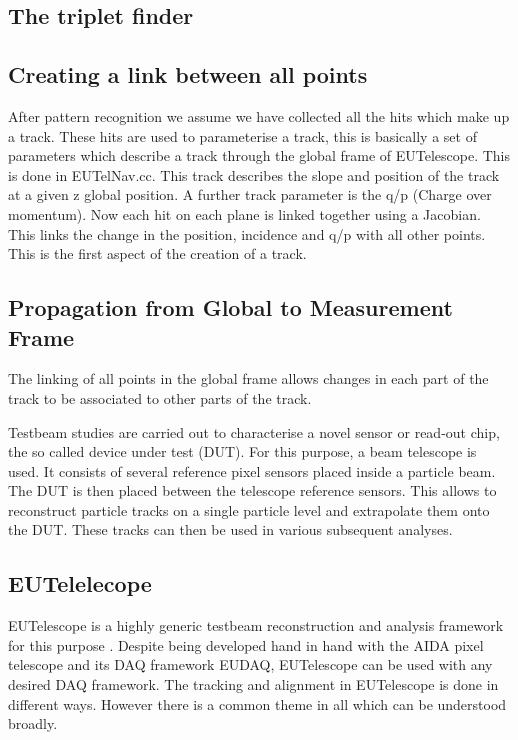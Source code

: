 \subsection{The triplet finder}

\subsection{Creating a link between all points}

After pattern recognition we assume we have collected all the hits which make up a track. These hits are used to parameterise a track, this is basically a set of parameters which describe a track through the global frame of EUTelescope. 
This is done in EUTelNav.cc. This track describes the slope and position of the track at a given z global position. A further track parameter is the q/p (Charge over momentum). Now each hit on each plane is linked together using a Jacobian. This links the change in the position, incidence and q/p with all other points. This is the first aspect of the creation of a track. 


\subsection{Propagation from Global to Measurement Frame}

The linking of all points in the global frame allows changes in each part of the track to be associated to other parts of the track. 









Testbeam studies are carried out to characterise a novel sensor or read-out chip, the so called
device under test (DUT). For this purpose, a beam telescope is used. It consists
of several reference pixel sensors placed inside a particle beam. The DUT is then placed
between the telescope reference sensors. This allows to reconstruct particle tracks on a
single particle level and extrapolate them onto the DUT. These tracks can then be used
in various subsequent analyses\cite{AIDAnote}.
\subsection{EUTelelecope}
EUTelescope is a highly generic testbeam reconstruction and analysis framework for this
purpose \cite{EUD}. Despite being developed hand in hand with the AIDA pixel telescope and its
DAQ framework EUDAQ, EUTelescope can be used with any desired DAQ framework. 
The tracking and alignment in EUTelescope is done in different ways. However there is a common theme in all which can be understood broadly.  

